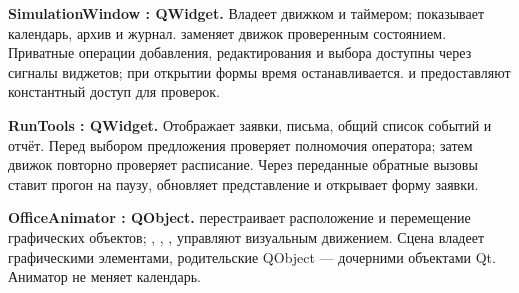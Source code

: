 \textbf{SimulationWindow : QWidget.} Владеет движком и таймером; показывает календарь, архив и журнал.  заменяет движок проверенным состоянием. Приватные операции добавления, редактирования и выбора доступны через сигналы виджетов; при открытии формы время останавливается.  и  предоставляют константный доступ для проверок.

\textbf{RunTools : QWidget.} Отображает заявки, письма, общий список событий и отчёт. Перед выбором предложения проверяет полномочия оператора; затем движок повторно проверяет расписание. Через переданные обратные вызовы ставит прогон на паузу, обновляет представление и открывает форму заявки.

\textbf{OfficeAnimator : QObject.}  перестраивает расположение и перемещение графических объектов; , , ,  управляют визуальным движением. Сцена владеет графическими элементами, родительские QObject --- дочерними объектами Qt. Аниматор не меняет календарь.
